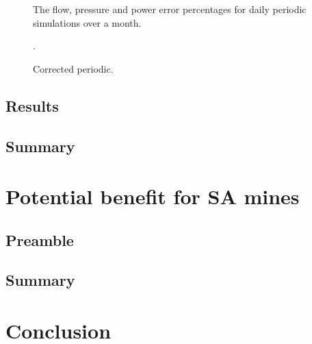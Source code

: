 	\begin{figure}[h]
		\centering
		\fbox{}
		\caption{The flow, pressure and power error percentages for daily periodic simulations over a month.}
		\label{fig: Periodic simulation}
	\end{figure}    
	\begin{figure}[h]
		\centering
		\fbox{}
		\caption{.}
		\label{fig: Periodic data reliabuility}
	\end{figure}    
	\begin{figure}[h]
		\centering
		\fbox{}
		\caption{Corrected periodic.}
		\label{fig: Corrected Periodic simulation}
	\end{figure}    
	\subsection{Results}
	\subsection{Summary}
\section{Potential benefit for SA mines}
	\subsection{Preamble}
	\subsection{Summary}
\section{Conclusion}